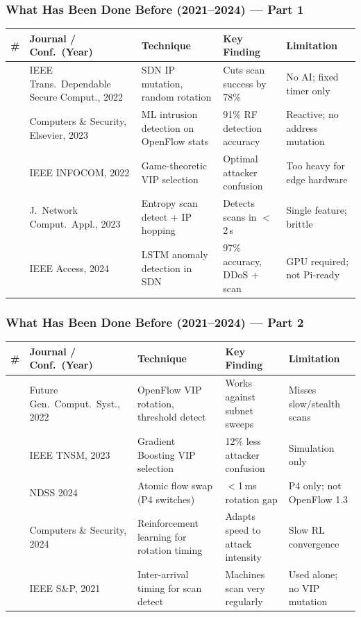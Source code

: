 \documentclass{beamer}
\begin{document}
\begin{frame}
\frametitle{What Has Been Done Before (2021--2024) --- Part 1}
\scriptsize
\renewcommand{\arraystretch}{1.35}
\begin{tabular}{>{\centering}p{0.3cm}
                >{\raggedright}p{2.5cm}
                >{\raggedright}p{2.3cm}
                >{\raggedright}p{2.6cm}
                >{\raggedright\arraybackslash}p{2.3cm}}
\toprule
\# & \textbf{Journal / Conf.\ (Year)} & \textbf{Technique} &
\textbf{Key Finding} & \textbf{Limitation} \\
\midrule
1 & IEEE Trans.\ Dependable Secure Comput., 2022 &
    SDN IP mutation, random rotation &
    Cuts scan success by 78\% &
    No AI; fixed timer only \\
\addlinespace
2 & Computers \& Security, Elsevier, 2023 &
    ML intrusion detection on OpenFlow stats &
    91\% RF detection accuracy &
    Reactive; no address mutation \\
\addlinespace
3 & IEEE INFOCOM, 2022 &
    Game-theoretic VIP selection &
    Optimal attacker confusion &
    Too heavy for edge hardware \\
\addlinespace
4 & J.\ Network Comput.\ Appl., 2023 &
    Entropy scan detect + IP hopping &
    Detects scans in $<$2\,s &
    Single feature; brittle \\
\addlinespace
5 & IEEE Access, 2024 &
    LSTM anomaly detection in SDN &
    97\% accuracy, DDoS + scan &
    GPU required; not Pi-ready \\
\bottomrule
\end{tabular}
\end{frame}

\begin{frame}
\frametitle{What Has Been Done Before (2021--2024) --- Part 2}
\scriptsize
\renewcommand{\arraystretch}{1.35}
\begin{tabular}{>{\centering}p{0.3cm}
                >{\raggedright}p{2.5cm}
                >{\raggedright}p{2.3cm}
                >{\raggedright}p{2.6cm}
                >{\raggedright\arraybackslash}p{2.3cm}}
\toprule
\# & \textbf{Journal / Conf.\ (Year)} & \textbf{Technique} &
\textbf{Key Finding} & \textbf{Limitation} \\
\midrule
6 & Future Gen.\ Comput.\ Syst., 2022 &
    OpenFlow VIP rotation, threshold detect &
    Works against subnet sweeps &
    Misses slow/stealth scans \\
\addlinespace
7 & IEEE TNSM, 2023 &
    Gradient Boosting VIP selection &
    12\% less attacker confusion &
    Simulation only \\
\addlinespace
8 & NDSS 2024 &
    Atomic flow swap (P4 switches) &
    $<$1\,ms rotation gap &
    P4 only; not OpenFlow 1.3 \\
\addlinespace
9 & Computers \& Security, 2024 &
    Reinforcement learning for rotation timing &
    Adapts speed to attack intensity &
    Slow RL convergence \\
\addlinespace
10 & IEEE S\&P, 2021 &
    Inter-arrival timing for scan detect &
    Machines scan very regularly &
    Used alone; no VIP mutation \\
\bottomrule
\end{tabular}
\end{frame}
\end{document}
